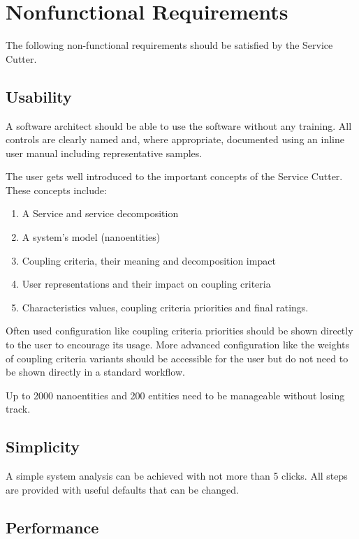 \section{Nonfunctional Requirements}

The following non-functional requirements should be satisfied by the Service Cutter.

\subsection{Usability}
\label{sec:usability}

A software architect should be able to use the software without any training. All controls are clearly named and, where appropriate, documented using an inline user manual including representative samples.

The user gets well introduced to the important concepts of the Service Cutter. These concepts include:

\begin{enumerate}
	\item A Service and service decomposition
	\item A system's model (nanoentities)
	\item Coupling criteria, their meaning and decomposition impact
	\item User representations and their impact on coupling criteria
	\item Characteristics values, coupling criteria priorities and final ratings.
\end{enumerate}

Often used configuration like coupling criteria priorities should be shown directly to the user to encourage its usage. More advanced configuration like the weights of coupling criteria variants should be accessible for the user but do not need to be shown directly in a standard workflow. 

Up to 2000 nanoentities and 200 entities need to be manageable without losing track.

\subsection{Simplicity}

A simple system analysis can be achieved with not more than 5 clicks. All steps are provided with useful defaults that can be changed.

\subsection{Performance}

